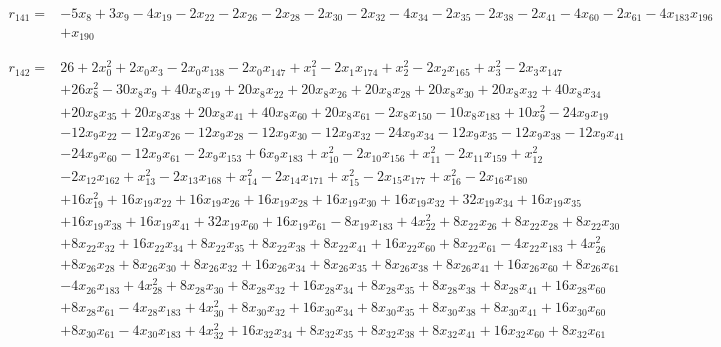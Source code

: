 \begin{align*}
r_{141}={}&-5x_{8}+3x_{9}-4x_{19}-2x_{22}-2x_{26}-2x_{28}-2x_{30}-2x_{32}-4x_{34}-2x_{35}-2x_{38}-2x_{41}-4x_{60}-2x_{61}-4x_{183}x_{196}\\
&+x_{190}
\end{align*}

\begin{align*}
r_{142}={}&26+2x_{0}^{2}+2x_{0}x_{3}-2x_{0}x_{138}-2x_{0}x_{147}+x_{1}^{2}-2x_{1}x_{174}+x_{2}^{2}-2x_{2}x_{165}+x_{3}^{2}-2x_{3}x_{147}\\
&+26x_{8}^{2}-30x_{8}x_{9}+40x_{8}x_{19}+20x_{8}x_{22}+20x_{8}x_{26}+20x_{8}x_{28}+20x_{8}x_{30}+20x_{8}x_{32}+40x_{8}x_{34}\\
&+20x_{8}x_{35}+20x_{8}x_{38}+20x_{8}x_{41}+40x_{8}x_{60}+20x_{8}x_{61}-2x_{8}x_{150}-10x_{8}x_{183}+10x_{9}^{2}-24x_{9}x_{19}\\
&-12x_{9}x_{22}-12x_{9}x_{26}-12x_{9}x_{28}-12x_{9}x_{30}-12x_{9}x_{32}-24x_{9}x_{34}-12x_{9}x_{35}-12x_{9}x_{38}-12x_{9}x_{41}\\
&-24x_{9}x_{60}-12x_{9}x_{61}-2x_{9}x_{153}+6x_{9}x_{183}+x_{10}^{2}-2x_{10}x_{156}+x_{11}^{2}-2x_{11}x_{159}+x_{12}^{2}\\
&-2x_{12}x_{162}+x_{13}^{2}-2x_{13}x_{168}+x_{14}^{2}-2x_{14}x_{171}+x_{15}^{2}-2x_{15}x_{177}+x_{16}^{2}-2x_{16}x_{180}\\
&+16x_{19}^{2}+16x_{19}x_{22}+16x_{19}x_{26}+16x_{19}x_{28}+16x_{19}x_{30}+16x_{19}x_{32}+32x_{19}x_{34}+16x_{19}x_{35}\\
&+16x_{19}x_{38}+16x_{19}x_{41}+32x_{19}x_{60}+16x_{19}x_{61}-8x_{19}x_{183}+4x_{22}^{2}+8x_{22}x_{26}+8x_{22}x_{28}+8x_{22}x_{30}\\
&+8x_{22}x_{32}+16x_{22}x_{34}+8x_{22}x_{35}+8x_{22}x_{38}+8x_{22}x_{41}+16x_{22}x_{60}+8x_{22}x_{61}-4x_{22}x_{183}+4x_{26}^{2}\\
&+8x_{26}x_{28}+8x_{26}x_{30}+8x_{26}x_{32}+16x_{26}x_{34}+8x_{26}x_{35}+8x_{26}x_{38}+8x_{26}x_{41}+16x_{26}x_{60}+8x_{26}x_{61}\\
&-4x_{26}x_{183}+4x_{28}^{2}+8x_{28}x_{30}+8x_{28}x_{32}+16x_{28}x_{34}+8x_{28}x_{35}+8x_{28}x_{38}+8x_{28}x_{41}+16x_{28}x_{60}\\
&+8x_{28}x_{61}-4x_{28}x_{183}+4x_{30}^{2}+8x_{30}x_{32}+16x_{30}x_{34}+8x_{30}x_{35}+8x_{30}x_{38}+8x_{30}x_{41}+16x_{30}x_{60}\\
&+8x_{30}x_{61}-4x_{30}x_{183}+4x_{32}^{2}+16x_{32}x_{34}+8x_{32}x_{35}+8x_{32}x_{38}+8x_{32}x_{41}+16x_{32}x_{60}+8x_{32}x_{61}\\

\end{align*}
